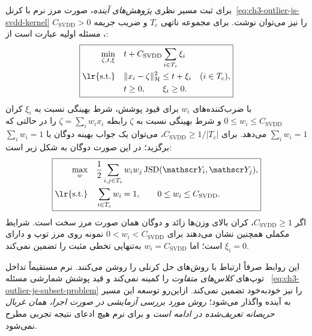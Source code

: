 برای ثبت مسیر نظری
\emph{پژوهش‌های آینده}،
صورت مرز نرم 
با کرنل~\eqref{eq:ch3-outlier-js-svdd-kernel}
را نیز می‌توان نوشت.
برای مجموعه ناتهی $T_c$
و ضریب جریمه
$C_{\mathrm{SVDD}}>0$،
مسئله اولیه عبارت است از:
\begin{equation}\label{eq:ch3-outlier-js-svdd-soft-primal}
\boxed{
\begin{aligned}
\min_{\zeta,t,\xi}\quad&
t+C_{\mathrm{SVDD}}\sum_{i\in T_c}\xi_i\\
\text{\lr{s.t.}}\quad&
\|x_i-\zeta\|_{\mathcal H}^2
\le t+\xi_i\quad(i\in T_c),\\
&t\ge0,\qquad \xi_i\ge0.
\end{aligned}}
\end{equation}
با ضرب‌کننده‌های $w_i$
برای قیود پوشش،
شرط بهینگی نسبت به
$\xi_i$ کران
$0\le w_i\le C_{\mathrm{SVDD}}$
و شرط بهینگی نسبت به
$\zeta$ رابطه
$\zeta=\sum_iw_ix_i$
را در حالتی که
$\sum_iw_i=1$ می‌دهد.
برای $C_{\mathrm{SVDD}}\ge
1/|T_c|$، می‌توان
یک جواب بهینه دوگان با
$\sum_iw_i=1$ برگزید؛
در این صورت دوگان
به شکل زیر است:
\begin{equation}\label{eq:ch3-outlier-js-svdd-soft-dual}
\boxed{
\begin{aligned}
\max_{w}\quad&
\frac12\sum_{i,j\in T_c}
w_iw_j\operatorname{JSD}
(\mathscr Y_i,\mathscr Y_j),\\
\text{\lr{s.t.}}\quad&
\sum_{i\in T_c}w_i=1,\qquad
0\le w_i\le C_{\mathrm{SVDD}}.
\end{aligned}}
\end{equation}
اگر $C_{\mathrm{SVDD}}\ge1$،
کران بالای وزن‌ها زائد
و دوگان همان صورت
مرز سخت است.
شرایط مکملی همچنین
نشان می‌دهند برای
$0<w_i<C_{\mathrm{SVDD}}$
نمونه روی مرز توپ
و دارای $\xi_i=0$ است؛
اما $w_i=C_{\mathrm{SVDD}}$
به‌تنهایی تخطی مثبت
را تضمین نمی‌کند.

این روابط صرفاً ارتباط
با روش‌های حل کرنلی را
روشن می‌کنند. 
نرم مستقیماً تداخل
توپ‌های \emph{کلاس‌های متفاوت}
را کمینه نمی‌کند و
قید پوشش شمارشی مسئله~
\eqref{eq:ch3-outlier-js-subset-problem}
را نیز خودبه‌خود تضمین
نمی‌کند. ازاین‌رو توسعه
این مسیر به آینده
واگذار می‌شود؛
\emph{روش مورد بررسی
آزمایشی در صورت اجرا،
همان غربال حریصانه
تعریف‌شده در ادامه است}
و برای  نرم
هیچ ادعای نتیجه تجربی
مطرح نمی‌شود.

